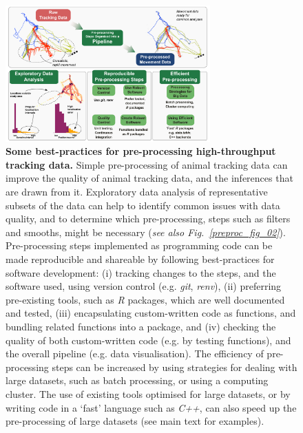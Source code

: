         \begin{figure}
            \centering
            \includegraphics[width=0.7\textwidth]{figures/preprocessing/fig_01.png}
            \caption{
                \textbf{Some best-practices for pre-processing high-throughput tracking data.}
                Simple pre-processing of animal tracking data can improve the quality of animal tracking data, and the inferences that are drawn from it.
                Exploratory data analysis of representative subsets of the data can help to identify common issues with data quality, and to determine which pre-processing, steps such as filters and smooths, might be necessary (\textit{see also Fig.~\ref{preproc_fig_02}}).
                Pre-processing steps implemented as programming code can be made reproducible and shareable by following best-practices for software development: (i) tracking changes to the steps, and the software used, using version control (e.g. \textit{git}, \textit{renv}), (ii) preferring pre-existing tools, such as \textit{R} packages, which are well documented and tested, (iii) encapsulating custom-written code as functions, and bundling related functions into a package, and (iv) checking the quality of both custom-written code (e.g. by testing functions), and the overall pipeline (e.g. data visualisation).
                The efficiency of pre-processing steps can be increased by using strategies for dealing with large datasets, such as batch processing, or using a computing cluster.
                The use of existing tools optimised for large datasets, or by writing code in a `fast' language such as \textit{C++}, can also speed up the pre-processing of large datasets (see main text for examples).
            }
            \label{preproc_fig_01}
        \end{figure}
    
